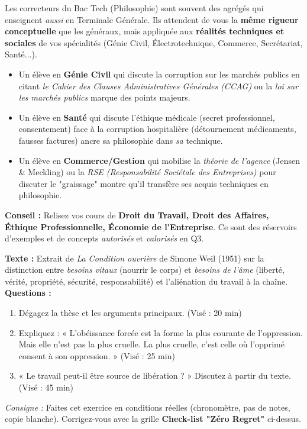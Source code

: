 \documentclass[11pt]{article}
\begin{document}
\begin{savaistu}
Les correcteurs du Bac Tech (Philosophie) sont souvent des agrégés qui enseignent \emph{aussi} en Terminale Générale. Ils attendent de vous la \textbf{même rigueur conceptuelle} que les généraux, mais appliquée aux \textbf{réalités techniques et sociales} de vos spécialités (Génie Civil, Électrotechnique, Commerce, Secrétariat, Santé...).
\begin{itemize}
    \item Un élève en \textbf{Génie Civil} qui discute la corruption sur les marchés publics en citant \emph{le Cahier des Clauses Administratives Générales (CCAG)} ou la \emph{loi sur les marchés publics} marque des points majeurs.
    \item Un élève en \textbf{Santé} qui discute l'éthique médicale (secret professionnel, consentement) face à la corruption hospitalière (détournement médicaments, fausses factures) ancre sa philosophie dans \emph{sa} technique.
    \item Un élève en \textbf{Commerce/Gestion} qui mobilise la \emph{théorie de l'agence} (Jensen \& Meckling) ou la \emph{RSE (Responsabilité Sociétale des Entreprises)} pour discuter le "graissage" montre qu'il transfère ses acquis techniques en philosophie.
\end{itemize}
\textbf{Conseil :} Relisez vos cours de \textbf{Droit du Travail, Droit des Affaires, Éthique Professionnelle, Économie de l'Entreprise}. Ce sont des réservoirs d'exemples et de concepts \emph{autorisés} et \emph{valorisés} en Q3.
\end{savaistu}

\begin{exercice}
\textbf{Texte :} Extrait de \emph{La Condition ouvrière} de Simone Weil (1951) sur la distinction entre \emph{besoins vitaux} (nourrir le corps) et \emph{besoins de l'âme} (liberté, vérité, propriété, sécurité, responsabilité) et l'aliénation du travail à la chaîne.
\textbf{Questions :}
\begin{enumerate}
    \item Dégagez la thèse et les arguments principaux. (Visé : 20 min)
    \item Expliquez : « L'obéissance forcée est la forme la plus courante de l'oppression. Mais elle n'est pas la plus cruelle. La plus cruelle, c'est celle où l'opprimé consent à son oppression. » (Visé : 25 min)
    \item « Le travail peut-il être source de libération ? » Discutez à partir du texte. (Visé : 45 min)
\end{enumerate}
\textit{Consigne :} Faites cet exercice en conditions réelles (chronomètre, pas de notes, copie blanche). Corrigez-vous avec la grille \textbf{Check-list "Zéro Regret"} ci-dessus.
\end{exercice}
\end{document}
